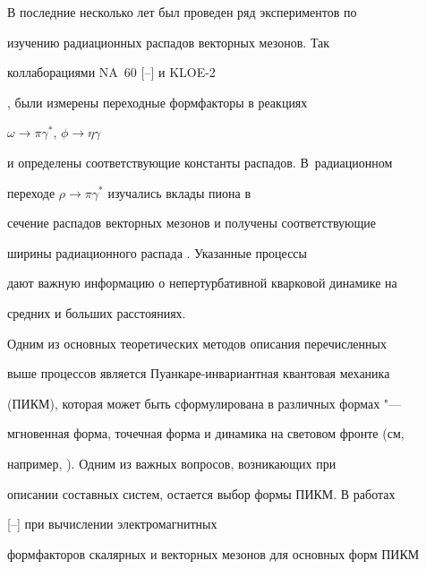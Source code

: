 \makerutitle











В последние несколько лет был проведен ряд экспериментов по

изучению радиационных распадов векторных мезонов. Так

коллаборациями NA~60 [--] и KLOE-2

\cite{Kloe11}, были измерены переходные формфакторы в реакциях

$\omega  \to  \pi \gamma^{*}$, $\phi  \to  \eta \gamma$

и определены соответствующие константы распадов. В~радиационном

переходе $\rho \to \pi\gamma^{*}$ изучались вклады пиона в

сечение распадов векторных мезонов и получены соответствующие

ширины радиационного распада \cite{Amsler08}. Указанные процессы

дают важную информацию о непертурбативной кварковой динамике на

средних и больших расстояниях.



Одним из основных теоретических методов описания перечисленных

выше процессов является Пуанкаре-инвариантная квантовая механика

(ПИКМ), которая может быть сформулирована в различных формах "---

мгновенная форма, точечная форма и динамика на световом фронте (см,

например, \cite{KrT09}). Одним из важных вопросов, возникающих при

описании составных систем, остается выбор формы ПИКМ. В работах

[--] при вычислении электромагнитных

формфакторов скалярных и векторных мезонов для основных форм ПИКМ

